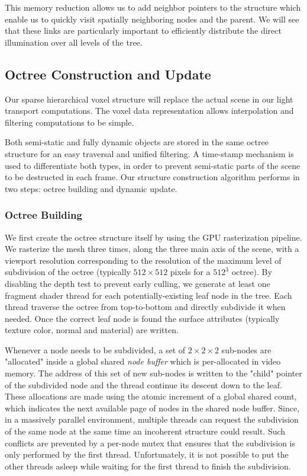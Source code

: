 This memory reduction allows us to add neighbor pointers to the structure which enable us to quickly visit spatially neighboring nodes and the parent. We will see that these links are particularly important to efficiently distribute the direct illumination over all levels of the tree.




\subsection{Octree Construction and Update}
Our sparse hierarchical voxel structure will replace the actual scene in our light transport computations. The voxel data representation allows interpolation and filtering computations to be simple.

Both semi-static and fully dynamic objects are stored in the same octree structure for an easy traversal and unified filtering. A time-stamp mechanism is used to differentiate both types, in order to prevent semi-static parts of the scene to be destructed in each frame. Our structure construction algorithm performs in two steps: octree building and dynamic update.



\subsubsection{Octree Building}
We first create the octree structure itself by using the GPU rasterization pipeline. We rasterize the mesh three times, along the three main axis of the scene, with a viewport resolution corresponding to the resolution of the maximum level of subdivision of the  octree (typically $512\times 512$ pixels for a $512^{3}$ octree). By disabling the depth test to prevent early culling, we generate at least one fragment shader thread for each potentially-existing leaf node in the tree. Each thread traverse the octree from top-to-bottom and directly subdivide it when needed. Once the correct leaf node is found the surface attributes (typically texture color, normal and material) are written. 

Whenever a node needs to be subdivided, a set of $2\times 2\times 2$ sub-nodes are "allocated" inside a global shared \textit{node buffer} which is per-allocated in video memory. The address of this set of new sub-nodes is written to the "child" pointer of the subdivided node and the thread continue its descent down to the leaf. These allocations are made using the atomic increment of a global shared count, which indicates the next available page of nodes in the shared node buffer. Since, in a massively parallel environment, multiple threads can request the subdivision of the same node at the same time an incoherent structure could result. Such conflicts are prevented by a per-node mutex that ensures that the subdivision is only performed by the first thread. Unfortunately, it is not possible to put the other threads asleep while waiting for the first thread to finish the subdivision.

